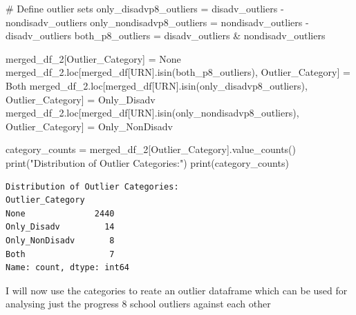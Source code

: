 \documentclass[
  letterpaper,
  DIV=11,
  numbers=noendperiod]{scrartcl}
\newenvironment{Shaded}{\begin{snugshade}}{\end{snugshade}}
\newcommand{\BuiltInTok}[1]{\textcolor[rgb]{0.00,0.23,0.31}{#1}}
\newcommand{\CommentTok}[1]{\textcolor[rgb]{0.37,0.37,0.37}{#1}}
\newcommand{\NormalTok}[1]{\textcolor[rgb]{0.00,0.23,0.31}{#1}}
\newcommand{\OperatorTok}[1]{\textcolor[rgb]{0.37,0.37,0.37}{#1}}
\newcommand{\StringTok}[1]{\textcolor[rgb]{0.13,0.47,0.30}{#1}}
\begin{document}
\begin{Shaded}
\begin{Highlighting}[]


\CommentTok{\# Define outlier sets}
\NormalTok{only\_disadvp8\_outliers }\OperatorTok{=}\NormalTok{ disadv\_outliers }\OperatorTok{{-}}\NormalTok{ nondisadv\_outliers}
\NormalTok{only\_nondisadvp8\_outliers }\OperatorTok{=}\NormalTok{ nondisadv\_outliers }\OperatorTok{{-}}\NormalTok{ disadv\_outliers}
\NormalTok{both\_p8\_outliers }\OperatorTok{=}\NormalTok{ disadv\_outliers }\OperatorTok{\&}\NormalTok{ nondisadv\_outliers}


\NormalTok{merged\_df\_2[}\StringTok{\textquotesingle{}Outlier\_Category\textquotesingle{}}\NormalTok{] }\OperatorTok{=} \StringTok{\textquotesingle{}None\textquotesingle{}}
\NormalTok{merged\_df\_2.loc[merged\_df[}\StringTok{\textquotesingle{}URN\textquotesingle{}}\NormalTok{].isin(both\_p8\_outliers), }\StringTok{\textquotesingle{}Outlier\_Category\textquotesingle{}}\NormalTok{] }\OperatorTok{=} \StringTok{\textquotesingle{}Both\textquotesingle{}}
\NormalTok{merged\_df\_2.loc[merged\_df[}\StringTok{\textquotesingle{}URN\textquotesingle{}}\NormalTok{].isin(only\_disadvp8\_outliers), }\StringTok{\textquotesingle{}Outlier\_Category\textquotesingle{}}\NormalTok{] }\OperatorTok{=} \StringTok{\textquotesingle{}Only\_Disadv\textquotesingle{}}
\NormalTok{merged\_df\_2.loc[merged\_df[}\StringTok{\textquotesingle{}URN\textquotesingle{}}\NormalTok{].isin(only\_nondisadvp8\_outliers), }\StringTok{\textquotesingle{}Outlier\_Category\textquotesingle{}}\NormalTok{] }\OperatorTok{=} \StringTok{\textquotesingle{}Only\_NonDisadv\textquotesingle{}}


\NormalTok{category\_counts }\OperatorTok{=}\NormalTok{ merged\_df\_2[}\StringTok{\textquotesingle{}Outlier\_Category\textquotesingle{}}\NormalTok{].value\_counts()}
\BuiltInTok{print}\NormalTok{(}\StringTok{"Distribution of Outlier Categories:"}\NormalTok{)}
\BuiltInTok{print}\NormalTok{(category\_counts)}


\end{Highlighting}
\end{Shaded}

\begin{verbatim}
Distribution of Outlier Categories:
Outlier_Category
None              2440
Only_Disadv         14
Only_NonDisadv       8
Both                 7
Name: count, dtype: int64
\end{verbatim}

I will now use the categories to reate an outlier dataframe which can be
used for analysing just the progress 8 school outliers against each
other
\end{document}
